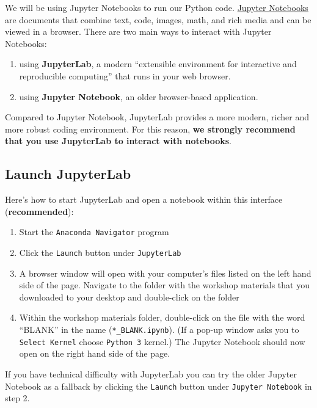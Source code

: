 \documentclass[
]{book}
\providecommand{\tightlist}{%
  \setlength{\itemsep}{0pt}\setlength{\parskip}{0pt}}
\begin{document}
We will be using Jupyter Notebooks to run our Python code. \href{https://jupyter-notebook.readthedocs.io/en/stable/}{Jupyter Notebooks} are documents that combine text, code, images, math, and rich media and can be viewed in a browser. There are two main ways to interact with Jupyter Notebooks:

\begin{enumerate}
\def\labelenumi{\arabic{enumi}.}
\tightlist
\item
  using \textbf{JupyterLab}, a modern ``extensible environment for interactive and reproducible computing'' that runs in your web browser.
\item
  using \textbf{Jupyter Notebook}, an older browser-based application.
\end{enumerate}

Compared to Jupyter Notebook, JupyterLab provides a more modern, richer and more robust coding environment. For this reason, \textbf{we strongly recommend that you use JupyterLab to interact with notebooks}.

\hypertarget{launch-jupyterlab}{%
\subsection{Launch JupyterLab}\label{launch-jupyterlab}}

Here's how to start JupyterLab and open a notebook within this interface (\textbf{recommended}):

\begin{enumerate}
\def\labelenumi{\arabic{enumi}.}
\tightlist
\item
  Start the \texttt{Anaconda\ Navigator} program
\item
  Click the \texttt{Launch} button under \texttt{JupyterLab}
\item
  A browser window will open with your computer's files listed on the left hand side of the page. Navigate to the folder with the workshop materials that you downloaded to your desktop and double-click on the folder
\item
  Within the workshop materials folder, double-click on the file with the word ``BLANK'' in the name (\texttt{*\_BLANK.ipynb}). (If a pop-up window asks you to \texttt{Select\ Kernel} choose \texttt{Python\ 3} kernel.) The Jupyter Notebook should now open on the right hand side of the page.
\end{enumerate}

If you have technical difficulty with JupyterLab you can try the older Jupyter Notebook as a fallback by clicking the \texttt{Launch} button under \texttt{Jupyter\ Notebook} in step 2.
\end{document}
